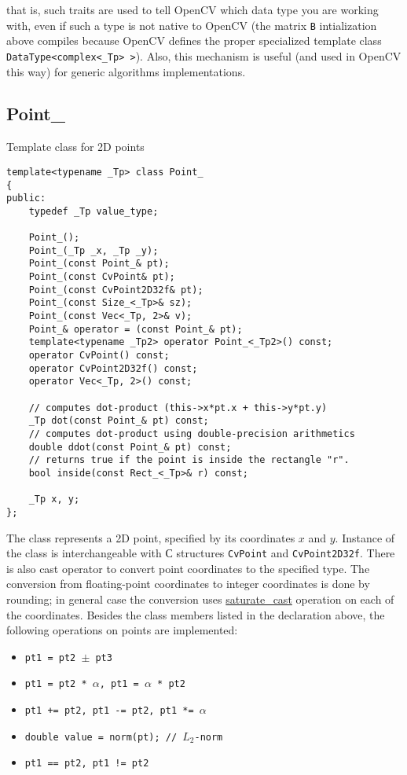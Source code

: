 that is, such traits are used to tell OpenCV which data type you are working with, even if such a type is not native to OpenCV (the matrix \texttt{B} intialization above compiles because OpenCV defines the proper specialized template class \texttt{DataType<complex<\_Tp> >}). Also, this mechanism is useful (and used in OpenCV this way) for generic algorithms implementations.

\subsection{Point\_}
Template class for 2D points

\begin{lstlisting}
template<typename _Tp> class Point_
{
public:
    typedef _Tp value_type;
    
    Point_();
    Point_(_Tp _x, _Tp _y);
    Point_(const Point_& pt);
    Point_(const CvPoint& pt);
    Point_(const CvPoint2D32f& pt);
    Point_(const Size_<_Tp>& sz);
    Point_(const Vec<_Tp, 2>& v);
    Point_& operator = (const Point_& pt);
    template<typename _Tp2> operator Point_<_Tp2>() const;
    operator CvPoint() const;
    operator CvPoint2D32f() const;
    operator Vec<_Tp, 2>() const;

    // computes dot-product (this->x*pt.x + this->y*pt.y)
    _Tp dot(const Point_& pt) const;
    // computes dot-product using double-precision arithmetics
    double ddot(const Point_& pt) const;
    // returns true if the point is inside the rectangle "r".
    bool inside(const Rect_<_Tp>& r) const;
    
    _Tp x, y;
};
\end{lstlisting}

The class represents a 2D point, specified by its coordinates $x$ and $y$.
Instance of the class is interchangeable with С structures \texttt{CvPoint} and \texttt{CvPoint2D32f}. There is also cast operator to convert point coordinates to the specified type. The conversion from floating-point coordinates to integer coordinates is done by rounding; in general case the conversion uses \hyperref[saturatecast]{saturate\_cast} operation on each of the coordinates. Besides the class members listed in the declaration above, the following operations on points are implemented:

\begin{itemize}
    \item \texttt{pt1 = pt2 $\pm$ pt3}
    \item \texttt{pt1 = pt2 * $\alpha$, pt1 = $\alpha$ * pt2}
    \item \texttt{pt1 += pt2, pt1 -= pt2, pt1 *= $\alpha$}
    \item \texttt{double value = norm(pt); // $L_2$-norm}
    \item \texttt{pt1 == pt2, pt1 != pt2}    
\end{itemize}

